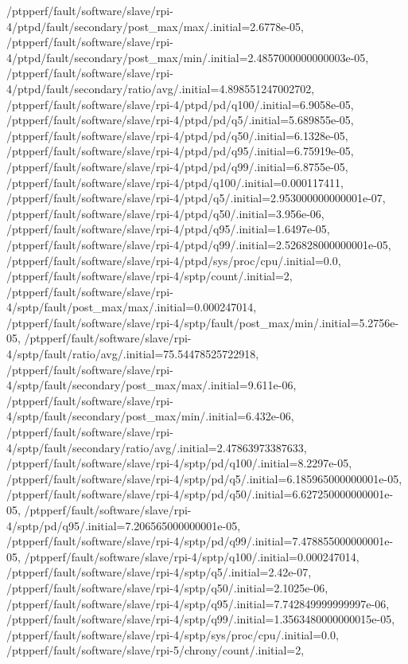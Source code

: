 {    /ptpperf/fault/software/slave/rpi-4/ptpd/fault/secondary/post_max/max/.initial=2.6778e-05,
    /ptpperf/fault/software/slave/rpi-4/ptpd/fault/secondary/post_max/min/.initial=2.4857000000000003e-05,
    /ptpperf/fault/software/slave/rpi-4/ptpd/fault/secondary/ratio/avg/.initial=4.898551247002702,
    /ptpperf/fault/software/slave/rpi-4/ptpd/pd/q100/.initial=6.9058e-05,
    /ptpperf/fault/software/slave/rpi-4/ptpd/pd/q5/.initial=5.689855e-05,
    /ptpperf/fault/software/slave/rpi-4/ptpd/pd/q50/.initial=6.1328e-05,
    /ptpperf/fault/software/slave/rpi-4/ptpd/pd/q95/.initial=6.75919e-05,
    /ptpperf/fault/software/slave/rpi-4/ptpd/pd/q99/.initial=6.8755e-05,
    /ptpperf/fault/software/slave/rpi-4/ptpd/q100/.initial=0.000117411,
    /ptpperf/fault/software/slave/rpi-4/ptpd/q5/.initial=2.953000000000001e-07,
    /ptpperf/fault/software/slave/rpi-4/ptpd/q50/.initial=3.956e-06,
    /ptpperf/fault/software/slave/rpi-4/ptpd/q95/.initial=1.6497e-05,
    /ptpperf/fault/software/slave/rpi-4/ptpd/q99/.initial=2.526828000000001e-05,
    /ptpperf/fault/software/slave/rpi-4/ptpd/sys/proc/cpu/.initial=0.0,
    /ptpperf/fault/software/slave/rpi-4/sptp/count/.initial=2,
    /ptpperf/fault/software/slave/rpi-4/sptp/fault/post_max/max/.initial=0.000247014,
    /ptpperf/fault/software/slave/rpi-4/sptp/fault/post_max/min/.initial=5.2756e-05,
    /ptpperf/fault/software/slave/rpi-4/sptp/fault/ratio/avg/.initial=75.54478525722918,
    /ptpperf/fault/software/slave/rpi-4/sptp/fault/secondary/post_max/max/.initial=9.611e-06,
    /ptpperf/fault/software/slave/rpi-4/sptp/fault/secondary/post_max/min/.initial=6.432e-06,
    /ptpperf/fault/software/slave/rpi-4/sptp/fault/secondary/ratio/avg/.initial=2.47863973387633,
    /ptpperf/fault/software/slave/rpi-4/sptp/pd/q100/.initial=8.2297e-05,
    /ptpperf/fault/software/slave/rpi-4/sptp/pd/q5/.initial=6.185965000000001e-05,
    /ptpperf/fault/software/slave/rpi-4/sptp/pd/q50/.initial=6.627250000000001e-05,
    /ptpperf/fault/software/slave/rpi-4/sptp/pd/q95/.initial=7.206565000000001e-05,
    /ptpperf/fault/software/slave/rpi-4/sptp/pd/q99/.initial=7.478855000000001e-05,
    /ptpperf/fault/software/slave/rpi-4/sptp/q100/.initial=0.000247014,
    /ptpperf/fault/software/slave/rpi-4/sptp/q5/.initial=2.42e-07,
    /ptpperf/fault/software/slave/rpi-4/sptp/q50/.initial=2.1025e-06,
    /ptpperf/fault/software/slave/rpi-4/sptp/q95/.initial=7.742849999999997e-06,
    /ptpperf/fault/software/slave/rpi-4/sptp/q99/.initial=1.3563480000000015e-05,
    /ptpperf/fault/software/slave/rpi-4/sptp/sys/proc/cpu/.initial=0.0,
    /ptpperf/fault/software/slave/rpi-5/chrony/count/.initial=2,
}
